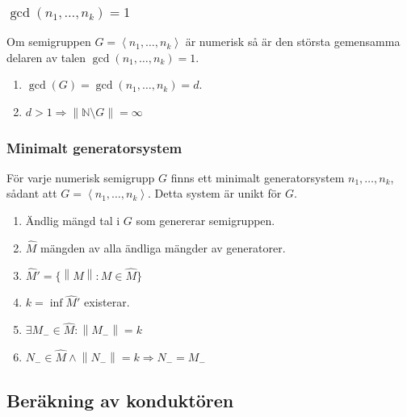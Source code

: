 \documentclass{beamer}
\begin{document}
\begin{frame}
	\frametitle{$\gcd(n_1, \ldots, n_k) = 1$}
\begin{Theorem}
	Om semigruppen $G = \left<n_1, \ldots, n_k\right>$ är numerisk så är den största gemensamma delaren av talen $\gcd(n_1, \ldots, n_k) = 1$.
\end{Theorem}

\begin{enumerate}
	\item<3-> $\gcd(G)=\gcd(n_1,\ldots,n_k)=d$.
	\item<4-> $d>1 \Longrightarrow \left\|\mathbb{N} \setminus G \right\| = \infty$
\end{enumerate}
\end{frame}

\begin{frame}
	\frametitle{Minimalt generatorsystem}
\begin{Theorem}
	För varje numerisk semigrupp $G$ finns ett minimalt generatorsystem $n_1, \ldots, n_k$, sådant att $G = \left<n_1, \ldots, n_k\right>$. Detta system är unikt för $G$.
\end{Theorem}

\begin{enumerate}
	\item<3-> Ändlig mängd tal i $G$ som genererar semigruppen.
	\item<4-> $\widehat{M}$ mängden av alla ändliga mängder av generatorer.
	\item<5-> $\widehat{M}' = \{ \left\|M\right\| : M \in \widehat{M}\}$
	\item<6-> $k = \inf \widehat{M}'$ existerar.
	\item<7-> $\exists M_- \in \widehat{M} : \left\|M_-\right\|=k$
	\item<8-> $N_- \in \widehat{M} \wedge \left\|N_-\right\|=k \Longrightarrow N_- = M_-$
\end{enumerate}\end{frame}

\subsection{Beräkning av konduktören}
\end{document}
